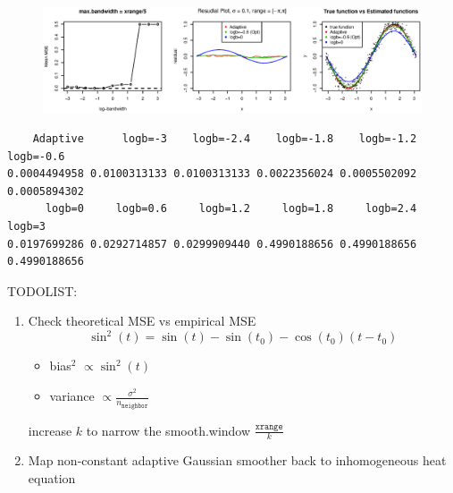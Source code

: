 \documentclass{article}
\begin{document}
\begin{itemize}
\begin{figure}[H]
\includegraphics[width=\linewidth]{pic/sim.plot11.eps}
\end{figure}
\begin{verbatim}
    Adaptive      logb=-3    logb=-2.4    logb=-1.8    logb=-1.2    logb=-0.6 
0.0004494958 0.0100313133 0.0100313133 0.0022356024 0.0005502092 0.0005894302 
      logb=0     logb=0.6     logb=1.2     logb=1.8     logb=2.4       logb=3 
0.0197699286 0.0292714857 0.0299909440 0.4990188656 0.4990188656 0.4990188656 
\end{verbatim}


TODOLIST:
\begin{enumerate}
\item Check theoretical MSE vs empirical MSE
$$\sin^2(t) = \sin(t) - \sin(t_0)- \cos(t_0)(t-t_0)$$
\begin{itemize}
\item bias$^2$ $\propto \sin^2(t)$
\item variance $\propto \frac{\sigma^2}{n_{\texttt{neighbor}}}$
\end{itemize}
increase $k$ to narrow the smooth.window $ \frac{\texttt{xrange}}{k}$
\item Map non-constant adaptive Gaussian smoother back to inhomogeneous heat equation 
\end{enumerate}




\end{itemize}
\end{document}
